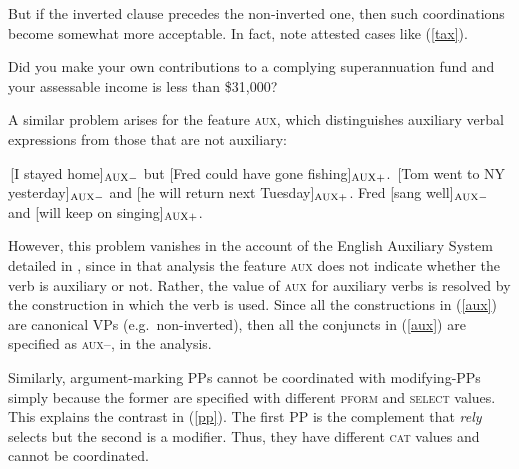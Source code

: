 \documentclass[output=paper
                ,modfonts
                ,nonflat
	        ,collection
	        ,collectionchapter
	        ,collectiontoclongg
 	        ,biblatex
                ,babelshorthands
                ,newtxmath
                ,draftmode
                ,colorlinks, citecolor=brown
]{./langsci/langscibook}
\begin{document}
\begin{exe}
\ex \begin{xlista}
\end{xlista}
\end{exe}

\noindent
But if the inverted clause precedes the non-inverted one, then such coordinations become somewhat more acceptable. In fact,  \citet[1332--1333]{rodney2} note attested cases like 
(\ref{tax}).

\begin{exe}
\ex Did you make your own contributions to a complying superannuation fund and
your assessable income is less than \$31,000?\label{tax}
\end{exe}

\noindent
A similar problem arises for the feature \textsc{aux}, which distinguishes auxiliary verbal expressions from those that
are not auxiliary:

\begin{exe}
\ex
\begin{xlista}
\ex \,[I stayed home]$_{\textup{\scriptsize AUX} -}$ but [Fred could have gone fishing]$_{\textup{\scriptsize AUX} +}$.
\ex \,[Tom went to NY yesterday]$_{\textup{\scriptsize AUX} -}$ and [he will return next Tuesday]$_{\textup{\scriptsize AUX} +}$.
\ex Fred [sang well]$_{\textup{\scriptsize AUX} -}$ and [will keep on singing]$_{\textup{\scriptsize AUX} +}$.
\end{xlista}\label{aux}
\end{exe}

\noindent
However, this problem vanishes in the account of the English Auxiliary System detailed in \citet{SagEtAl20}, since in that analysis
the feature \textsc{aux} does not indicate whether the verb is auxiliary or not. Rather, the value of \textsc{aux} for auxiliary verbs is resolved by the construction in which the verb is used. Since all the constructions in (\ref{aux}) are canonical VPs (e.g.\ non-inverted), then 
all the conjuncts in (\ref{aux}) are specified as \textsc{aux--}, in
the \citet{SagEtAl20} analysis.




Similarly, argument-marking PPs cannot be coordinated with modifying-PPs simply because the former are specified with different  \textsc{pform} and \textsc{select} values. This explains the contrast
in (\ref{pp}). The first PP is the complement that \emph{rely}
selects but the second is a modifier. Thus, they have different \textsc{cat} values 
and cannot be coordinated.
\end{document}
